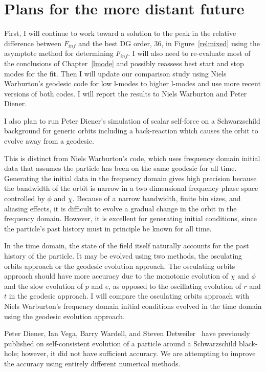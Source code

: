 \section{Plans for the more distant future}
First, I will continue to work toward a solution to the peak in the relative difference between $F_{inf}$ and the best DG order, 36, in Figure~\ref{relmixed} using the asymptote method for determining $F_{inf}$. I will also need to re-evaluate most of the conclusions of Chapter~\ref{lmode} and possibly reassess best start and stop modes for the fit. Then I will update our comparison study using Niels Warburton's geodesic code for low l-modes to higher l-modes and use more recent versions of both codes. I will report the results to Niels Warburton and Peter Diener. 

I also plan to run Peter Diener's simulation of scalar self-force on a Schwarzschild background for generic orbits including a back-reaction which causes the orbit to evolve away from a geodesic.

This is distinct from Niels Warburton's code, which uses frequency domain initial data that assumes the particle has been on the same geodesic for all time. Generating the initial data in the frequency domain gives high precision because the bandwidth of the orbit is narrow in a two dimensional frequency phase space controlled by $\phi$ and $\chi$. Because of a narrow bandwidth, finite bin sizes, and aliasing effects, it is difficult to evolve a gradual change in the orbit in the frequency domain. However, it is excellent for generating initial conditions, since the particle's past history must in principle be known for all time. 


In the time domain, the state of the field itself naturally accounts for the past history of the particle. It may be evolved using two methods, the osculating orbits approach or the geodesic evolution approach. The osculating orbits approach should have more accuracy due to the monotonic evolution of $\chi$ and $\phi$ and the slow evolution of $p$ and $e$, as opposed to the oscillating evolution of $r$ and $t$ in the geodesic approach. I will compare the osculating orbits approach with Niels Warburton's frequency domain initial conditions evolved in the time domain using the geodesic evolution approach. 


Peter Diener, Ian Vega, Barry Wardell, and Steven Detweiler~\cite{diener_vega_wardell_detwieler_2012} have previously published on self-consistent evolution of a particle around a Schwarzschild black-hole; however, it did not have sufficient accuracy. We are attempting to improve the accuracy using entirely different numerical methods.

